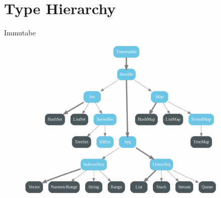 \documentclass[xcolor=svgnames]{beamer}
\begin{document}
    \section{Type Hierarchy}


    \begin{frame}[fragile]
    {Immutabe}
        \begin{figure}
            \centering
\includegraphics[width=0.9\textwidth]{collections-immutable-diagram.pdf}
        \end{figure}
    \end{frame}
\end{document}
